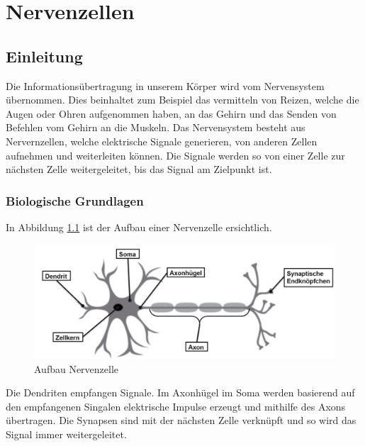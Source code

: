 %
%
%
%
\chapter{Nervenzellen\label{chapter:nerven}}
\begin{refsection}
\section{Einleitung}

Die Informationsübertragung in unserem Körper wird vom Nervensystem übernommen.
Dies beinhaltet zum Beispiel das vermitteln von Reizen, welche die Augen oder Ohren aufgenommen haben,
an das Gehirn und das Senden von Befehlen vom Gehirn an die Muskeln.
Das Nervensystem besteht aus Nervernzellen, welche elektrische Signale generieren, von anderen Zellen aufnehmen und weiterleiten können.
Die Signale werden so von einer Zelle zur nächsten Zelle weitergeleitet, bis das Signal am Zielpunkt ist.
\subsection{Biologische Grundlagen}
In Abbildung \ref{fig:Aufbau Nervenzelle} ist der Aufbau einer Nervenzelle ersichtlich. 
\begin{figure}[h]
    \centering
    \includegraphics[width=\textwidth]{papers/nerven/Bilder/NervenAufbau2.png}
    \caption{Aufbau Nervenzelle \cite{nerven:rosadu}}
    \label{fig:Aufbau Nervenzelle}
\end{figure}

Die Dendriten empfangen Signale. 
Im Axonhügel im Soma werden basierend auf den empfangenen Singalen elektrische Impulse erzeugt und mithilfe des Axons übertragen.
Die Synapsen sind mit der nächsten Zelle verknüpft und so wird das Signal immer weitergeleitet.


\end{refsection}
